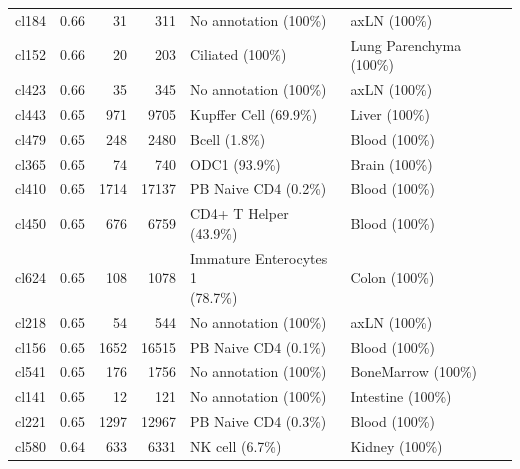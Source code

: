 \begin{table}[ht!]
\begin{tabular}{lrrrll}
  cl184 & 0.66 &  31 & 311 & No annotation (100\%) & axLN (100\%) \\ 
  cl152 & 0.66 &  20 & 203 & Ciliated (100\%) & Lung Parenchyma (100\%) \\ 
  cl423 & 0.66 &  35 & 345 & No annotation (100\%) & axLN (100\%) \\ 
  cl443 & 0.65 & 971 & 9705 & Kupffer Cell (69.9\%) & Liver (100\%) \\ 
  cl479 & 0.65 & 248 & 2480 & Bcell (1.8\%) & Blood (100\%) \\ 
  cl365 & 0.65 &  74 & 740 & ODC1 (93.9\%) & Brain (100\%) \\ 
  cl410 & 0.65 & 1714 & 17137 & PB Naive CD4  (0.2\%) & Blood (100\%) \\ 
  cl450 & 0.65 & 676 & 6759 & CD4+ T Helper (43.9\%) & Blood (100\%) \\ 
  cl624 & 0.65 & 108 & 1078 & \specialcell[t]{Immature Enterocytes 1\\(78.7\%)} & Colon (100\%) \\ 
  cl218 & 0.65 &  54 & 544 & No annotation (100\%) & axLN (100\%) \\ 
  cl156 & 0.65 & 1652 & 16515 & PB Naive CD4  (0.1\%) & Blood (100\%) \\ 
  cl541 & 0.65 & 176 & 1756 & No annotation (100\%) & BoneMarrow (100\%) \\ 
  cl141 & 0.65 &  12 & 121 & No annotation (100\%) & Intestine (100\%) \\ 
  cl221 & 0.65 & 1297 & 12967 & PB Naive CD4  (0.3\%) & Blood (100\%) \\ 
  cl580 & 0.64 & 633 & 6331 & NK cell (6.7\%) & Kidney (100\%) \\ 
   \bottomrule
\end{tabular}
\end{table}  
  
